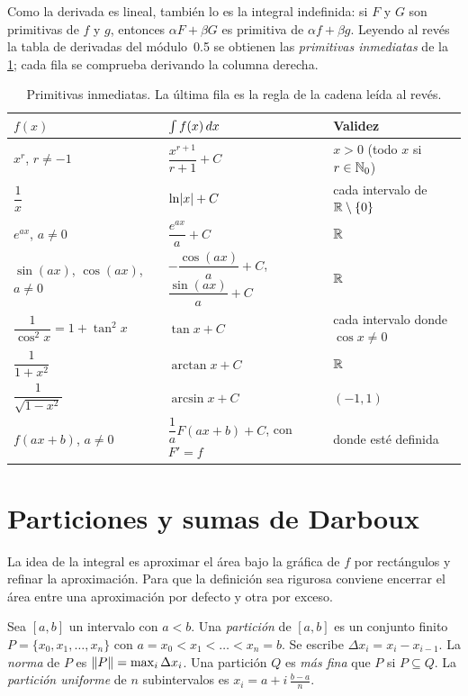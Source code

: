 Como la derivada es lineal, también lo es la integral indefinida: si $F$ y $G$ son primitivas de $f$ y $g$, entonces $\alpha F+\beta G$ es primitiva de $\alpha f+\beta g$. Leyendo al revés la tabla de derivadas del módulo~0.5 se obtienen las \emph{primitivas inmediatas} de la \cref{tab:inmediatas}; cada fila se comprueba derivando la columna derecha.

\begin{table}[h]
\centering
\small
\begin{tabular}{@{}lll@{}}
\toprule
$f(x)$ & $\int f(x)\mathop{}\!d x$ & Validez \\
\midrule
$x^{r}$, $r\neq-1$ & $\dfrac{x^{r+1}}{r+1}+C$ & $x>0$ (todo $x$ si $r\in\mathbb{N}_0$) \\[4pt]
$\dfrac1x$ & $\ln\lvert x\rvert+C$ & cada intervalo de $\mathbb{R}\setminus\{0\}$ \\[4pt]
$e^{ax}$, $a\neq0$ & $\dfrac{e^{ax}}{a}+C$ & $\mathbb{R}$ \\[4pt]
$\sin(ax)$, $\cos(ax)$, $a\neq0$ & $-\dfrac{\cos(ax)}{a}+C$, \ $\dfrac{\sin(ax)}{a}+C$ & $\mathbb{R}$ \\[4pt]
$\dfrac{1}{\cos^{2}x}=1+\tan^{2}x$ & $\tan x+C$ & cada intervalo donde $\cos x\neq0$ \\[4pt]
$\dfrac{1}{1+x^{2}}$ & $\arctan x+C$ & $\mathbb{R}$ \\[4pt]
$\dfrac{1}{\sqrt{1-x^{2}}}$ & $\arcsin x+C$ & $(-1,1)$ \\[4pt]
$f(ax+b)$, $a\neq0$ & $\dfrac{1}{a}F(ax+b)+C$, con $F'=f$ & donde esté definida \\
\bottomrule
\end{tabular}
\caption{Primitivas inmediatas. La última fila es la regla de la cadena leída al revés.}
\label{tab:inmediatas}
\end{table}

\addtocounter{definicion}{1}%

\section{Particiones y sumas de Darboux}

La idea de la integral es aproximar el área bajo la gráfica de $f$ por rectángulos y refinar la aproximación. Para que la definición sea rigurosa conviene encerrar el área entre una aproximación por defecto y otra por exceso.

\begin{definicion}[Partición]\label{def:particion}
Sea $[a,b]$ un intervalo con $a<b$. Una \emph{partición} de $[a,b]$ es un conjunto finito $P=\{x_0,x_1,\dots,x_n\}$ con $a=x_0<x_1<\dots<x_n=b$. Se escribe $\Delta x_i=x_i-x_{i-1}$. La \emph{norma} de $P$ es $\lVert P\rVert=\max_i\Delta x_i$. Una partición $Q$ es \emph{más fina} que $P$ si $P\subseteq Q$. La \emph{partición uniforme} de $n$ subintervalos es $x_i=a+i\,\frac{b-a}{n}$.
\end{definicion}

